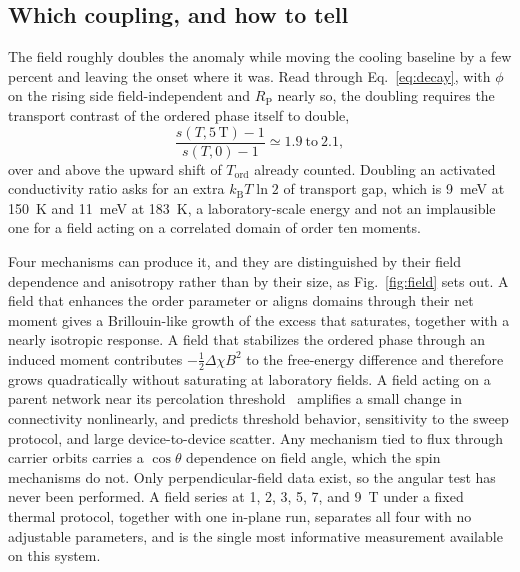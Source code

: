 \documentclass[reprint,twocolumn,prb,amsmath,amssymb,superscriptaddress,floatfix]{revtex4-2}
\newcommand{\kB}{k_{\mathrm{B}}}
\newcommand{\Tcol}{T_{\mathrm{ord}}}
\begin{document}
\subsection{Which coupling, and how to tell}

The field roughly doubles the anomaly while moving the cooling baseline by a few percent and
leaving the onset where it was. Read through Eq.~\eqref{eq:decay}, with $\phi$ on the rising
side field-independent and $R_{\mathrm{P}}$ nearly so, the doubling requires the transport
contrast of the ordered phase itself to double,
\begin{equation}
  \frac{s(T,5\,\mathrm{T})-1}{s(T,0)-1} \simeq 1.9\ \text{to}\ 2.1 ,
  \label{eq:contrast}
\end{equation}
over and above the upward shift of $\Tcol$ already counted. Doubling an activated conductivity
ratio asks for an extra $\kB T\ln2$ of transport gap, which is 9~meV at 150~K and 11~meV at
183~K, a laboratory-scale energy and not an implausible one for a field acting on a correlated
domain of order ten moments.

Four mechanisms can produce it, and they are distinguished by their field dependence and
anisotropy rather than by their size, as Fig.~\ref{fig:field} sets out. A field that enhances the
order parameter or aligns
domains through their net moment gives a Brillouin-like growth of the excess that saturates,
together with a nearly isotropic response. A field that stabilizes the ordered phase through an
induced moment contributes $-\tfrac12\Delta\chi B^{2}$ to the free-energy difference and
therefore grows quadratically without saturating at laboratory fields. A field acting on a
parent network near its percolation threshold~\cite{Kirkpatrick1973} amplifies a small change
in connectivity nonlinearly, and predicts threshold behavior, sensitivity to the sweep
protocol, and large device-to-device scatter. Any mechanism tied to flux through carrier
orbits carries a $\cos\theta$ dependence on field angle, which the spin mechanisms do not. Only
perpendicular-field data exist, so the angular test has never been performed. A field series at
1, 2, 3, 5, 7, and 9~T under a fixed thermal protocol, together with one in-plane run,
separates all four with no adjustable parameters, and is the single most informative
measurement available on this system.
\end{document}
